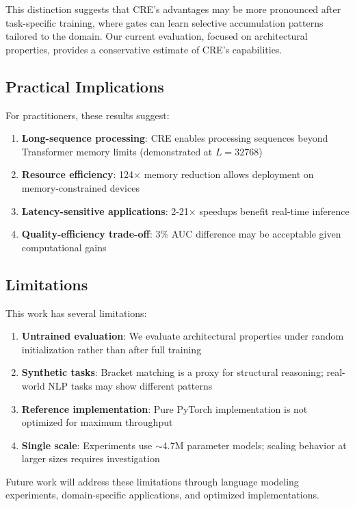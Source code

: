\documentclass{article}
\begin{document}
This distinction suggests that CRE's advantages may be more pronounced after task-specific training, where gates can learn selective accumulation patterns tailored to the domain. Our current evaluation, focused on architectural properties, provides a conservative estimate of CRE's capabilities.

\subsection{Practical Implications}

For practitioners, these results suggest:

\begin{enumerate}
\item \textbf{Long-sequence processing}: CRE enables processing sequences beyond Transformer memory limits (demonstrated at $L=32768$)
\item \textbf{Resource efficiency}: 124$\times$ memory reduction allows deployment on memory-constrained devices
\item \textbf{Latency-sensitive applications}: 2-21$\times$ speedups benefit real-time inference
\item \textbf{Quality-efficiency trade-off}: 3\% AUC difference may be acceptable given computational gains
\end{enumerate}

\subsection{Limitations}

This work has several limitations:

\begin{enumerate}
\item \textbf{Untrained evaluation}: We evaluate architectural properties under random initialization rather than after full training
\item \textbf{Synthetic tasks}: Bracket matching is a proxy for structural reasoning; real-world NLP tasks may show different patterns
\item \textbf{Reference implementation}: Pure PyTorch implementation is not optimized for maximum throughput
\item \textbf{Single scale}: Experiments use $\sim$4.7M parameter models; scaling behavior at larger sizes requires investigation
\end{enumerate}

Future work will address these limitations through language modeling experiments, domain-specific applications, and optimized implementations.
\end{document}
